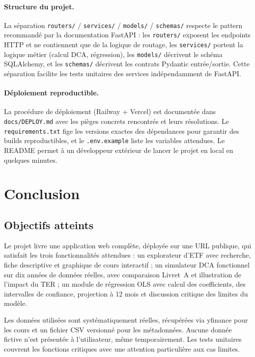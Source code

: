 \documentclass[11pt,a4paper]{article}
\begin{document}
\paragraph{Structure du projet.}
La séparation \texttt{routers/} / \texttt{services/} / \texttt{models/}
/ \texttt{schemas/} respecte le pattern recommandé par la
documentation FastAPI : les \texttt{routers/} exposent les endpoints
HTTP et ne contiennent que de la logique de routage, les
\texttt{services/} portent la logique métier (calcul DCA,
régression), les \texttt{models/} décrivent le schéma SQLAlchemy, et
les \texttt{schemas/} décrivent les contrats Pydantic
entrée/sortie. Cette séparation facilite les tests unitaires des
services indépendamment de FastAPI.

\paragraph{Déploiement reproductible.}
La procédure de déploiement (Railway + Vercel) est documentée dans
\texttt{docs/DEPLOY.md} avec les pièges concrets rencontrés et leurs
résolutions. Le \texttt{requirements.txt} fige les versions exactes
des dépendances pour garantir des builds reproductibles, et le
\texttt{.env.example} liste les variables attendues. Le README permet
à un développeur extérieur de lancer le projet en local en quelques
minutes.

\section{Conclusion}
\label{sec:conclusion}

\subsection{Objectifs atteints}

Le projet livre une application web complète, déployée sur une URL
publique, qui satisfait les trois fonctionnalités attendues : un
explorateur d'ETF avec recherche, fiche descriptive et graphique de
cours interactif ; un simulateur DCA fonctionnel sur dix années de
données réelles, avec comparaison Livret~A et illustration de
l'impact du TER ; un module de régression OLS avec calcul des
coefficients, des intervalles de confiance, projection à 12 mois et
discussion critique des limites du modèle.

Les données utilisées sont systématiquement réelles, récupérées via
yfinance pour les cours et un fichier CSV versionné pour les
métadonnées. Aucune donnée fictive n'est présentée à l'utilisateur,
même temporairement. Les tests unitaires couvrent les fonctions
critiques avec une attention particulière aux cas limites.
\end{document}
